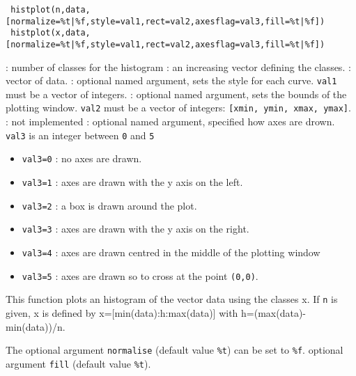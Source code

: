 
\begin{mandesc}
\end{mandesc}

\begin{calling_sequence}
\begin{verbatim}
 histplot(n,data,[normalize=%t|%f,style=val1,rect=val2,axesflag=val3,fill=%t|%f])
 histplot(x,data,[normalize=%t|%f,style=val1,rect=val2,axesflag=val3,fill=%t|%f])
\end{verbatim}
\end{calling_sequence}
\begin{parameters}
  \begin{varlist}
     : number of classes for the histogram
     : an increasing vector defining the classes.
     : vector of data.
     : optional named argument, sets the style for each curve. \verb+val1+
    must be a vector of integers.
     : optional named argument, sets the bounds of the plotting
    window. \verb+val2+ must be a vector of integers: \verb+[xmin, ymin, xmax, ymax]+.
     : not implemented
     : optional named argument, specified how axes are
    drown. \verb+val3+ is an integer between \verb+0+ and \verb+5+
    \begin{itemize}
    \item \verb+val3=0+ : no axes are drawn.
    \item \verb+val3=1+ : axes are drawn with the y axis on the left.
    \item \verb+val3=2+ : a box is drawn around the plot.
    \item \verb+val3=3+ : axes are drawn with the y axis on the right.
    \item \verb+val3=4+ : axes are drawn centred in the middle of the plotting window
    \item \verb+val3=5+ : axes are drawn so to cross at the point \verb+(0,0)+.
    \end{itemize}

\end{varlist}
\end{parameters}

\begin{mandescription}
  This function plots an histogram of the vector data using the
  classes x. If \verb+n+ is given, x is defined by x=[min(data):h:max(data)] with
  h=(max(data)-min(data))/n.

  The optional argument \verb+normalise+ (default value \verb+%t+) can be set to
  \verb+%f+.
  optional argument \verb+fill+ (default value \verb+%t+).


  
\end{mandescription}

